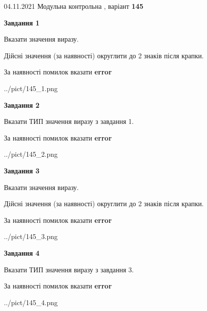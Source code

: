 \documentclass[11pt, ukrainian]{article}
\begin{document}
{04.11.2021 Модульна контрольна , варіант  \No \textbf { 145 }\par}
{
\begin {large}
{\begin {center}\textbf{Завдання 1}\end {center}}\par
Вказати значення виразу. \par
Дійсні значення (за наявності) округлити до 2 знаків після крапки. \par
За наявності помилок вказати \textbf{error}

\begin{center}
	{../pict/145_1.png}
\end{center}
\newpage

{\begin {center}\textbf{Завдання 2}\end {center}}\par
Вказати ТИП значення виразу з завдання 1. \par
За наявності помилок вказати \textbf{error}

\begin{center}
	{../pict/145_2.png}
\end{center}
\newpage

{\begin {center}\textbf{Завдання 3}\end {center}}\par
Вказати значення виразу. \par
Дійсні значення (за наявності) округлити до 2 знаків після крапки. \par
За наявності помилок вказати \textbf{error}

\begin{center}
	{../pict/145_3.png}
\end{center}
\newpage

{\begin {center}\textbf{Завдання 4}\end {center}}\par
Вказати ТИП значення виразу з завдання 3. \par
За наявності помилок вказати \textbf{error}

\begin{center}
	{../pict/145_4.png}
\end{center}
\newpage


\end{large}}
\end{document}
